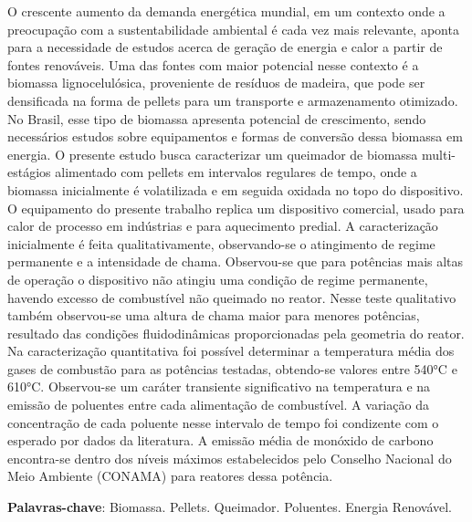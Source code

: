 
\setlength{\absparsep}{18pt} %
\begin{resumo}
O crescente aumento da demanda energética mundial, em um contexto onde a preocupação com a sustentabilidade ambiental é cada vez mais relevante, aponta para a necessidade de estudos acerca de geração de energia e calor a partir de fontes renováveis. Uma das fontes com maior potencial nesse contexto é a biomassa lignocelulósica, proveniente de resíduos de madeira, que pode ser densificada na forma de pellets para um transporte e armazenamento otimizado. No Brasil, esse tipo de biomassa apresenta potencial de crescimento, sendo necessários estudos sobre equipamentos e formas de conversão dessa biomassa em energia. O presente estudo busca caracterizar um queimador de biomassa multi-estágios alimentado com pellets em intervalos regulares de tempo, onde a biomassa inicialmente é volatilizada e em seguida oxidada no topo do dispositivo. O equipamento do presente trabalho replica um dispositivo comercial, usado para calor de processo em indústrias e para aquecimento predial. A caracterização inicialmente é feita qualitativamente, observando-se o atingimento de regime permanente e a intensidade de chama. Observou-se que para potências mais altas de operação o dispositivo não atingiu uma condição de regime permanente, havendo excesso de combustível não queimado no reator. Nesse teste qualitativo também observou-se uma altura de chama maior para menores potências, resultado das condições fluidodinâmicas proporcionadas pela geometria do reator. Na caracterização quantitativa foi possível determinar a temperatura média dos gases de combustão para as potências testadas, obtendo-se valores entre 540°C e 610°C. Observou-se um caráter transiente significativo na temperatura e na emissão de poluentes entre cada alimentação de combustível. A variação da concentração de cada poluente nesse intervalo de tempo foi condizente com o esperado por dados da literatura. A emissão média de monóxido de carbono encontra-se dentro dos níveis máximos estabelecidos pelo Conselho Nacional do Meio Ambiente (CONAMA) para reatores dessa potência.

 \textbf{Palavras-chave}: Biomassa. Pellets. Queimador. Poluentes. Energia Renovável.
\end{resumo}
